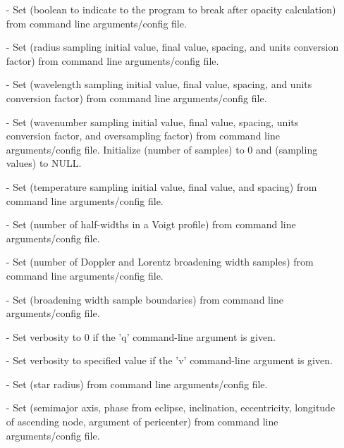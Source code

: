 \documentclass[letterpaper,12pt]{article}
\begin{document}
\begin{enumerate}[leftmargin=10pt, noitemsep, parsep=0pt, topsep=0ex]
\item[-] Set  (boolean to indicate to the program to break after opacity calculation) from command line arguments/config file.
\item[-] Set  (radius sampling initial value, final value, spacing, and units conversion factor) from command line arguments/config file.
\item[-] Set  (wavelength sampling initial value, final value, spacing, and units conversion factor) from command line arguments/config file.
\item[-] Set  (wavenumber sampling initial value, final value, spacing, units conversion factor, and oversampling factor) from command line arguments/config file. Initialize  (number of samples) to 0 and  (sampling values) to NULL.
\item[-] Set  (temperature sampling initial value, final value, and spacing) from command line arguments/config file.
\item[-] Set  (number of half-widths in a Voigt profile) from command line arguments/config file.
\item[-] Set  (number of Doppler and Lorentz broadening width samples) from command line arguments/config file.
\item[-] Set  (broadening width sample boundaries) from command line arguments/config file.
\item[-] Set verbosity to 0 if the 'q' command-line argument is given.
\item[-] Set verbosity to specified value if the 'v' command-line argument is given.
\item[-] Set  (star radius) from command line arguments/config file.
\item[-] Set  (semimajor axis, phase from eclipse, inclination, eccentricity, longitude of ascending node, argument of pericenter) from command line arguments/config file.

\end{enumerate}
\end{document}
